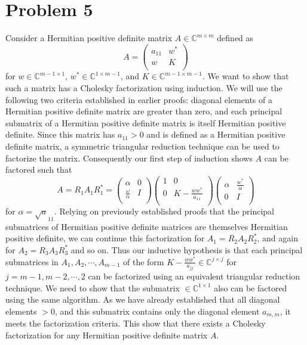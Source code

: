 \documentclass[12pt,a4paper,twoside]{article}
\begin{document}
\section{Problem 5}
Consider a Hermitian positive definite matrix $A \in \mathbb{C}^{m\times m}$ defined as
\begin{equation}
A=\begin{pmatrix}
a_{11}&w^* \\
w & K \\
\end{pmatrix} 
\end{equation} for $w\in \mathbb{C}^{m-1 \times 1}$, $w^* \in \mathbb{C}^{1 \times m-1}$, and $K \in \mathbb{C}^{m-1 \times m-1}$. We want to show that such a matrix has a Cholesky factorization using induction. We will use the following two criteria established in earlier proofs: diagonal elements of a Hermitian positive definite matrix are greater than zero, and each principal submatrix of a Hermitian positive definite matrix is itself Hermitian positive definite.  Since this matrix has $a_{11}>0$ and is defined as a Hermitian positive definite matrix, a symmetric triangular reduction technique can be used to factorize the matrix. Consequently our first step of induction shows $A$ can be factored such that
\begin{equation}
A=R_1A_1R_1^*=\begin{pmatrix}
\alpha & 0 \\
\frac{\omega}{\alpha}&I\\
\end{pmatrix}
\begin{pmatrix}
1 & 0 \\
0& K-\frac{ww^*}{a_{11}}\\
\end{pmatrix}
\begin{pmatrix}
\alpha& \frac{w^*}{\alpha}\\
0&I\\
\end{pmatrix}
\end{equation} for $\alpha = \sqrt a_{11}$. Relying on previously established proofs that the principal submatrices of Hermitian positive definite matrices are themselves Hermitian positive definite, we can continue this factorization for $A_1 =R_2 A_2 R_2^*$, and again for $A_2 = R_3 A_3 R_3^*$ and so on. Thus our inductive hypothesis is that each principal submatrices in $A_1, A_2, \cdots, A_{m-1}$ of the form $K-\frac{ww^*}{a_{jj}} \in \mathbb{C}^{j\times j}$ for $j =m-1,m-2, \cdots, 2$ can be factorized using an equivalent triangular reduction technique. We need to show that the submatrix $\in \mathbb{C}^{1\times 1}$ also can be factored using the same algorithm. As we have already established that all diagonal elements $>0$, and this submatrix contains only the diagonal element $a_{m,m}$, it meets the factorization criteria. This show that there exists a Cholesky factorization for any  Hermitian positive definite matrix $A$.
\end{document}

